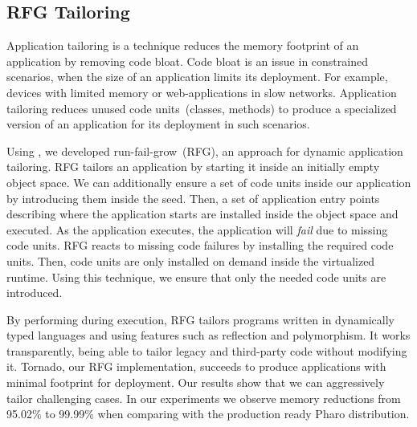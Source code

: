 \subsection{RFG Tailoring} 

Application tailoring is a technique reduces the memory footprint of an application by removing code bloat. Code bloat is an issue in constrained scenarios, when the size of an application limits its deployment. For example, devices with limited memory or web-applications in slow networks. Application tailoring reduces unused code units~(\eg classes, methods) to produce a specialized version of an application for its deployment in such scenarios.

Using \Vtt, we developed run-fail-grow~(RFG), an approach for dynamic application tailoring. RFG tailors an application by starting it inside an initially empty object space. We can additionally ensure a set of code units inside our application by introducing them inside the seed. Then, a set of application entry points describing where the application starts are installed inside the object space and executed. As the application executes, the application will \emph{fail} due to missing code units. RFG reacts to missing code failures by installing the required code units. Then, code units are only installed on demand inside the virtualized runtime. Using this technique, we ensure that only the needed code units are introduced.

By performing during execution, RFG tailors programs written in dynamically typed languages and using features such as reflection and polymorphism. It works transparently, being able to tailor legacy and third-party code without modifying it. Tornado, our RFG implementation, succeeds to produce applications with minimal footprint for deployment. Our results show that we can aggressively tailor challenging cases. In our experiments we observe memory reductions from 95.02\% to 99.99\% when comparing with the production ready Pharo distribution.

